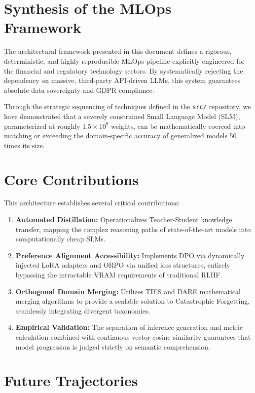 \documentclass[12pt,a4paper]{report}
\begin{document}
\section{Synthesis of the MLOps Framework}

The architectural framework presented in this document defines a rigorous, deterministic, and highly reproducible MLOps pipeline explicitly engineered for the financial and regulatory technology sectors. By systematically rejecting the dependency on massive, third-party API-driven LLMs, this system guarantees absolute data sovereignty and GDPR compliance.

Through the strategic sequencing of techniques defined in the \texttt{src/} repository, we have demonstrated that a severely constrained Small Language Model (SLM), parameterized at roughly $1.5 \times 10^9$ weights, can be mathematically coerced into matching or exceeding the domain-specific accuracy of generalized models 50 times its size.

\section{Core Contributions}

This architecture establishes several critical contributions:
\begin{enumerate}
    \item \textbf{Automated Distillation:} Operationalizes Teacher-Student knowledge transfer, mapping the complex reasoning paths of state-of-the-art models into computationally cheap SLMs.
    \item \textbf{Preference Alignment Accessibility:} Implements DPO via dynamically injected LoRA adapters and ORPO via unified loss structures, entirely bypassing the intractable VRAM requirements of traditional RLHF.
    \item \textbf{Orthogonal Domain Merging:} Utilizes TIES and DARE mathematical merging algorithms to provide a scalable solution to Catastrophic Forgetting, seamlessly integrating divergent taxonomies.
    \item \textbf{Empirical Validation:} The separation of inference generation and metric calculation combined with continuous vector cosine similarity guarantees that model progression is judged strictly on semantic comprehension.
\end{enumerate}

\section{Future Trajectories}
\end{document}
